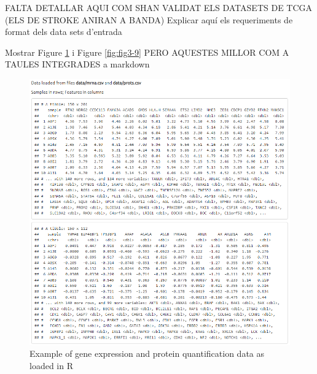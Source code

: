 \documentclass[a4paper, nobind]{templates/ociamthesis}
\begin{document}
\bigskip

FALTA DETALLAR AQUI COM SHAN VALIDAT ELS DATASETS DE TCGA (ELS DE STROKE ANIRAN A BANDA)
Explicar aquí els requeriments de format dels data sets d'entrada

Mostrar Figure \ref{fig:fig3-10} i Figure \ref{fig:fig3-9} PERO AQUESTES MILLOR COM A TAULES INTEGRADES a markdown

\begin{figure}

{\centering \includegraphics[width=0.95\linewidth]{figures/chapter3/3-10_input_data_R_example} 

}

\caption[Example of gene and protein data loaded in R]{Example of gene expression and protein quantification data as loaded in R}\label{fig:fig3-10}
\end{figure}
\end{document}
